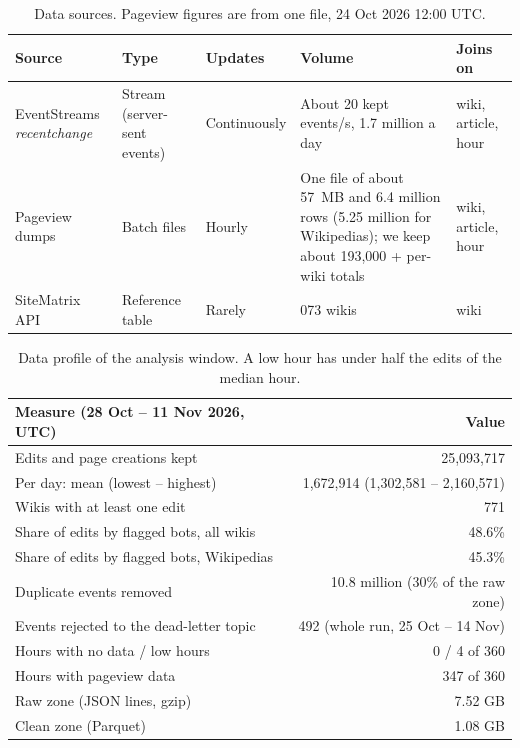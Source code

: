 \begin{table}[!htbp]
\centering
\small
\begin{tabularx}{\textwidth}{@{}>{\raggedright\arraybackslash}p{2.7cm} >{\raggedright\arraybackslash}p{2.2cm}
    >{\raggedright\arraybackslash}X >{\raggedright\arraybackslash}X >{\raggedright\arraybackslash}p{2.3cm}@{}}
\toprule
\textbf{Source} & \textbf{Type} & \textbf{Updates} & \textbf{Volume} & \textbf{Joins on} \\
\midrule
EventStreams \emph{recentchange} & Stream (server-sent events) & Continuously & About 20 kept events/s,
  1.7 million a day & wiki, article, hour \\
Pageview dumps & Batch files & Hourly & One file of about 57~MB and 6.4 million rows (5.25 million
  for Wikipedias); we keep about 193{,}000 + per-wiki totals & wiki, article, hour \\
SiteMatrix API & Reference table & Rarely & 1{,}073 wikis & wiki \\
\bottomrule
\end{tabularx}
\caption{Data sources. Pageview figures are from one file, 24 Oct 2026 12:00 UTC.}
\label{tab:sources}
\end{table}

\begin{table}[!htbp]
\centering
\small
\begin{tabular}{@{}lr@{}}
\toprule
\textbf{Measure (28 Oct -- 11 Nov 2026, UTC)} & \textbf{Value} \\
\midrule
Edits and page creations kept               & 25{,}093{,}717 \\
Per day: mean (lowest -- highest)            & 1{,}672{,}914 (1{,}302{,}581 -- 2{,}160{,}571) \\
Wikis with at least one edit                 & 771 \\
Share of edits by flagged bots, all wikis    & 48.6\% \\
Share of edits by flagged bots, Wikipedias   & 45.3\% \\
Duplicate events removed                     & 10.8 million (30\% of the raw zone) \\
Events rejected to the dead-letter topic     & 492 (whole run, 25 Oct -- 14 Nov) \\
Hours with no data / low hours               & 0 / 4 of 360 \\
Hours with pageview data                     & 347 of 360 \\
Raw zone (JSON lines, gzip)                  & 7.52 GB \\
Clean zone (Parquet)                         & 1.08 GB \\
\bottomrule
\end{tabular}
\caption{Data profile of the analysis window. A low hour has under half the edits of the median hour.}
\label{tab:profile}
\end{table}

